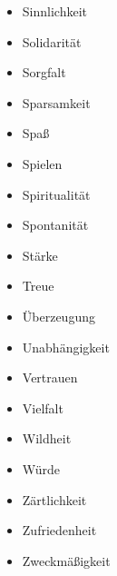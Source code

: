 \documentclass[../Lebensziel.tex]{subfiles}
\begin{document}
\begin{multicols}{3}
\begin{itemize}
        \item Sinnlichkeit
        \item Solidarität
        \item Sorgfalt
        \item Sparsamkeit
        \item Spaß
        \item Spielen
        \item Spiritualität
        \item Spontanität
        \item Stärke
        \item Treue
        \item Überzeugung
        \item Unabhängigkeit
        \item Vertrauen
        \item Vielfalt
        \item Wildheit
        \item Würde
        \item Zärtlichkeit
        \item Zufriedenheit
        \item Zweckmäßigkeit
    \end{itemize}
\end{multicols}
\end{document}
